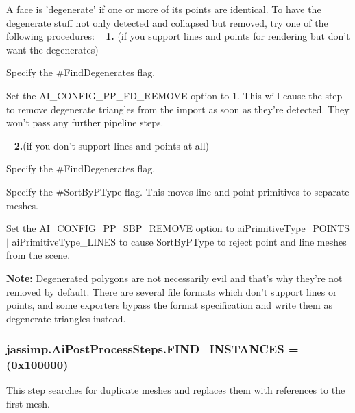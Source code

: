 A face is 'degenerate' if one or more of its points are identical. To have the degenerate stuff not only detected and collapsed but removed, try one of the following procedures\+: ~\newline
 {\bfseries 1.} (if you support lines and points for rendering but don't want the degenerates) 
\begin{DoxyItemize}
\item Specify the \#\+Find\+Degenerates flag. 
\item Set the {\ttfamily A\+I\+\_\+\+C\+O\+N\+F\+I\+G\+\_\+\+P\+P\+\_\+\+F\+D\+\_\+\+R\+E\+M\+O\+V\+E} option to 1. This will cause the step to remove degenerate triangles from the import as soon as they're detected. They won't pass any further pipeline steps. 
\end{DoxyItemize}~\newline
 {\bfseries 2.}(if you don't support lines and points at all) 
\begin{DoxyItemize}
\item Specify the \#\+Find\+Degenerates flag. 
\item Specify the \#\+Sort\+By\+P\+Type flag. This moves line and point primitives to separate meshes. 
\item Set the {\ttfamily A\+I\+\_\+\+C\+O\+N\+F\+I\+G\+\_\+\+P\+P\+\_\+\+S\+B\+P\+\_\+\+R\+E\+M\+O\+V\+E} option to {\ttfamily ai\+Primitive\+Type\+\_\+\+P\+O\+I\+N\+T\+S $\vert$ ai\+Primitive\+Type\+\_\+\+L\+I\+N\+E\+S} to cause Sort\+By\+P\+Type to reject point and line meshes from the scene. 
\end{DoxyItemize}{\bfseries Note\+:} Degenerated polygons are not necessarily evil and that's why they're not removed by default. There are several file formats which don't support lines or points, and some exporters bypass the format specification and write them as degenerate triangles instead. \hypertarget{enumjassimp_1_1_ai_post_process_steps_afd860b14d152f4a4a1e9900515d78a71}{
\subsubsection[{F\+I\+N\+D\+\_\+\+I\+N\+S\+T\+A\+N\+C\+E\+S}]{\setlength{\rightskip}{0pt plus 5cm}jassimp.\+Ai\+Post\+Process\+Steps.\+F\+I\+N\+D\+\_\+\+I\+N\+S\+T\+A\+N\+C\+E\+S =(0x100000)}}\label{enumjassimp_1_1_ai_post_process_steps_afd860b14d152f4a4a1e9900515d78a71}
This step searches for duplicate meshes and replaces them with references to the first mesh.

